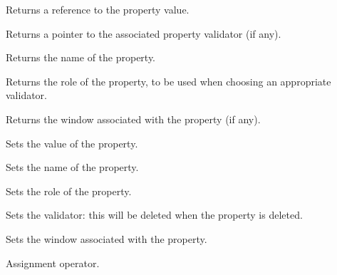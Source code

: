 
Returns a reference to the property value.



Returns a pointer to the associated property validator (if any).



Returns the name of the property.



Returns the role of the property, to be used when choosing an appropriate validator.



Returns the window associated with the property (if any).



Sets the value of the property.



Sets the name of the property.



Sets the role  of the property.



Sets the validator: this will be deleted when the property is deleted.



Sets the window associated with the property.



Assignment operator.

